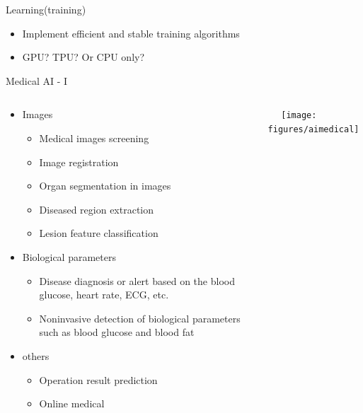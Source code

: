 \documentclass{beamer}
\begin{document}
\begin{CJK*}{UTF8}{gbsn}
\begin{frame}{Learning(training)}
\begin{itemize}
\begin{itemize}
\item Implement efficient and stable training algorithms

\item GPU? TPU? Or CPU only?
\end{itemize}
\end{itemize}
\end{frame}


\begin{frame}{Medical AI - I }
\begin{columns}
\begin{column}{0.5\textwidth}
\begin{itemize}
\item Images  
\begin{itemize}
\item Medical images screening
\item Image registration
\item Organ segmentation in images
\item Diseased region extraction
\item Lesion feature classification
\end{itemize}

\item Biological parameters
\begin{itemize}
\item Disease diagnosis or alert based on the blood glucose, heart rate, ECG, etc.
\item Noninvasive detection of biological parameters such as blood glucose and blood fat
\end{itemize}

\item others
\begin{itemize}
\item Operation result prediction
\item Online medical
\end{itemize}

\end{itemize}
\end{column}

\begin{column}{0.5\textwidth}
\centering  
\texttt{[image: figures/aimedical]} 
\end{column}
\end{columns}
\end{frame}





\end{CJK*}
\end{document}
